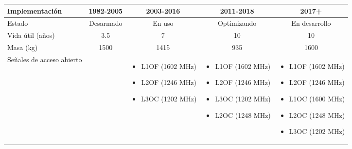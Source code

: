 \begin{center}
\begin{longtable}{|p{3cm}|c|c|c|c|}
        \cellcolor{lightblue}Implementación & 1982-2005 & 2003-2016 & 2011-2018 & 2017+ \\
        \hline
        \cellcolor{lightblue}Estado & Desarmado & En uso & Optimizando & En desarrollo \\
        \hline
        \cellcolor{lightblue}Vida útil (años) & 3.5 & 7 & 10 & 10 \\
        \hline
        \cellcolor{lightblue}Masa (kg) & 1500 & 1415 & 935 & 1600 \\
        \hline
        \cellcolor{lightblue}Señales de acceso abierto & \fontsize{9}{11}\selectfont{L1OF (1602 MHz)} & 
        \parbox[t]{2.5cm}{
            \vspace{-7pt}
            {\fontsize{9}{11}\selectfont
                \begin{itemize}[label={}, leftmargin=0pt, topsep=0pt, partopsep=0pt, parsep=0pt, itemsep=0pt]
                    \item L1OF (1602 MHz)
                    \item L2OF (1246 MHz)
                    \item L3OC (1202 MHz)
                \end{itemize}
            }
        } &
        \parbox[t]{2.5cm}{
            \vspace{-7pt}
            {\fontsize{9}{11}\selectfont
                \begin{itemize}[label={}, leftmargin=0pt, topsep=0pt, partopsep=0pt, parsep=0pt, itemsep=0pt]
                    \item L1OF (1602 MHz)
                    \item L2OF (1246 MHz)
                    \item L3OC (1202 MHz)
                    \item L2OC (1248 MHz)
                \end{itemize}
            }
        } &
        \parbox[t]{2.5cm}{
            \vspace{-7pt}
            {\fontsize{9}{11}\selectfont
                \begin{itemize}[label={}, leftmargin=0pt, topsep=0pt, partopsep=0pt, parsep=0pt, itemsep=0pt]
                    \item L1OF (1602 MHz)
                    \item L2OF (1246 MHz)
                    \item L1OC (1600 MHz)
                    \item L2OC (1248 MHz)
                    \item L3OC (1202 MHz)

\end{itemize}}}
\end{longtable}
\end{center}
